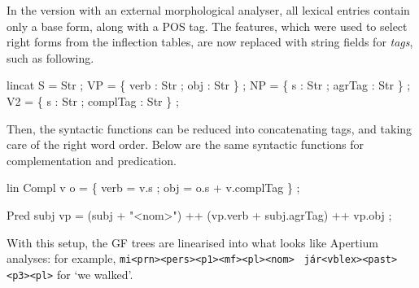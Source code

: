 \documentclass[10pt,a4paper]{article}
\newenvironment{Shaded}{\begin{snugshade}}{\end{snugshade}}
\newcommand{\DataTypeTok}[1]{\textcolor[rgb]{0.13,0.29,0.53}{{#1}}}
\newcommand{\StringTok}[1]{\textcolor[rgb]{0.31,0.60,0.02}{{#1}}}
\newcommand{\FunctionTok}[1]{\textcolor[rgb]{0.00,0.00,0.00}{{#1}}}
\newcommand{\NormalTok}[1]{{#1}}
\begin{document}
In the version with an external morphological analyser, all lexical
entries contain only a base form, along with a POS tag. The features,
which were used to select right forms from the inflection tables, are
now replaced with string fields for \emph{tags}, such as following.

\begin{Shaded}
\begin{Highlighting}[]
  \NormalTok{lincat}
    \DataTypeTok{S}  \FunctionTok{=} \DataTypeTok{Str} \NormalTok{;}
    \DataTypeTok{VP} \FunctionTok{=} \NormalTok{\{ verb }\FunctionTok{:} \DataTypeTok{Str} \NormalTok{; obj }\FunctionTok{:} \DataTypeTok{Str} \NormalTok{\} ;}
    \DataTypeTok{NP} \FunctionTok{=} \NormalTok{\{ s }\FunctionTok{:} \DataTypeTok{Str} \NormalTok{; agrTag }\FunctionTok{:} \DataTypeTok{Str} \NormalTok{\} ;}
    \DataTypeTok{V2} \FunctionTok{=} \NormalTok{\{ s }\FunctionTok{:} \DataTypeTok{Str} \NormalTok{; complTag }\FunctionTok{:} \DataTypeTok{Str} \NormalTok{\} ;}
\end{Highlighting}
\end{Shaded}


Then, the syntactic functions can be reduced into concatenating tags,
and taking care of the right word order. Below are the same syntactic
functions for complementation and predication.


\begin{Shaded}
\begin{Highlighting}[]
  \NormalTok{lin }
    \DataTypeTok{Compl} \NormalTok{v o }\FunctionTok{=} \NormalTok{\{ verb }\FunctionTok{=} \NormalTok{v}\FunctionTok{.}\NormalTok{s ;}
                  \NormalTok{obj }\FunctionTok{=} \NormalTok{o}\FunctionTok{.}\NormalTok{s }\FunctionTok{+} \NormalTok{v}\FunctionTok{.}\NormalTok{complTag \} ;}

    \DataTypeTok{Pred} \NormalTok{subj vp }\FunctionTok{=} \NormalTok{(subj }\FunctionTok{+} \StringTok{"<nom>"}\NormalTok{)}
                \FunctionTok{++} \NormalTok{(vp}\FunctionTok{.}\NormalTok{verb }\FunctionTok{+} \NormalTok{subj}\FunctionTok{.}\NormalTok{agrTag)}
                \FunctionTok{++} \NormalTok{vp}\FunctionTok{.}\NormalTok{obj ;}
\end{Highlighting}
\end{Shaded}

With this setup, the GF trees are linearised into what looks like
Apertium analyses: for example,
\texttt{mi<prn><pers><p1><mf><pl><nom>} \texttt{ j\'{a}r<vblex><past><p3><pl>} for `we walked'.
\end{document}

